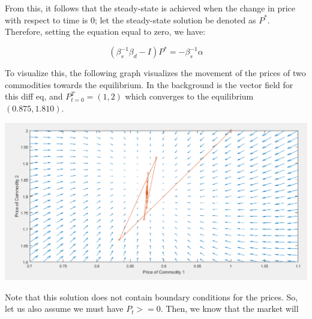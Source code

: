 \documentclass[12pt]{article}
\begin{document}
From this, it follows that the steady-state is achieved when the change in price with respect to time is 0; let the steady-state solution be denoted as $P^*$. Therefore, setting the equation equal to zero, we have:

$$(\beta_s^{-1} \beta_d - I) P^* = -\beta_s^{-1} \alpha$$

To visualize this, the following graph visualizes the movement of the prices of two commodities towards the equilibrium. In the background is the vector field for this diff eq, and $P_{t=0}^T = (1,2)$ which converges to the equilibrium $(0.875,1.810)$.

\begin{center}
\includegraphics[scale = 0.5]{figures/vector_field}
\end{center}

Note that this solution does not contain boundary conditions for the prices. So, let us also assume we must have $P_t >= 0$. Then, we know that the market will 
\end{document}
